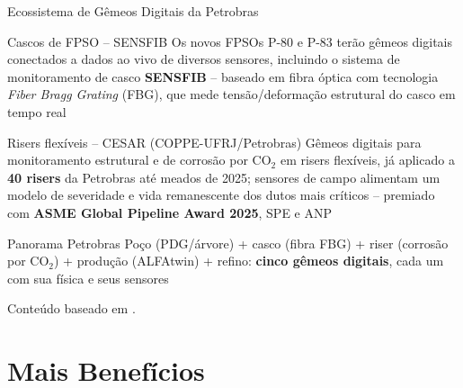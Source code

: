 \documentclass[aspectratio=169,xcolor=dvipsnames]{beamer}
\begin{document}
\begin{frame}{Ecossistema de Gêmeos Digitais da Petrobras}
    \begin{exampleblock}{Cascos de FPSO -- SENSFIB}
        Os novos FPSOs P-80 e P-83 terão gêmeos digitais conectados a dados ao vivo de diversos sensores, incluindo o sistema de monitoramento de casco \textbf{SENSFIB} -- baseado em fibra óptica com tecnologia \textit{Fiber Bragg Grating} (FBG), que mede tensão/deformação estrutural do casco em tempo real
    \end{exampleblock}
    \begin{exampleblock}{Risers flexíveis -- CESAR (COPPE-UFRJ/Petrobras)}
        Gêmeos digitais para monitoramento estrutural e de corrosão por CO$_2$ em risers flexíveis, já aplicado a \textbf{40 risers} da Petrobras até meados de 2025; sensores de campo alimentam um modelo de severidade e vida remanescente dos dutos mais críticos -- premiado com \textbf{ASME Global Pipeline Award 2025}, SPE e ANP
    \end{exampleblock}
    \begin{block}{Panorama Petrobras}
        Poço (PDG/árvore) + casco (fibra FBG) + riser (corrosão por CO$_2$) + produção (ALFAtwin) + refino: \textbf{cinco gêmeos digitais}, cada um com sua física e seus sensores
    \end{block}
    \vfill
    \footnotesize Conteúdo baseado em \cite{spe210260,otc2020}.
\end{frame}




\section{Mais Benefícios}

\end{document}

